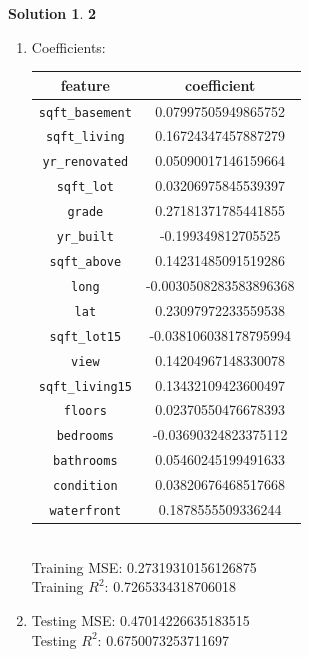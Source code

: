 \documentclass[11pt]{article}
\theoremstyle{definition}
\theoremstyle{nopunct}
\newtheorem*{s}{Solution}
\begin{document}
\begin{s}\textbf{2}
    \begin{enumerate} 
        \item Coefficients: \bigskip \\
            \begin{tabular}{c c}
                feature & coefficient \\
                \hline
                \texttt{sqft\_basement}  & 0.07997505949865752 \\
                \texttt{sqft\_living}    & 0.16724347457887279 \\
                \texttt{yr\_renovated}   & 0.05090017146159664 \\
                \texttt{sqft\_lot}       & 0.03206975845539397 \\
                \texttt{grade}          & 0.27181371785441855 \\
                \texttt{yr\_built}       & -0.199349812705525 \\
                \texttt{sqft\_above}     & 0.14231485091519286 \\
                \texttt{long}           & -0.0030508283583896368 \\
                \texttt{lat}            & 0.23097972233559538 \\
                \texttt{sqft\_lot15}     & -0.038106038178795994 \\
                \texttt{view}           & 0.14204967148330078 \\
                \texttt{sqft\_living15}  & 0.13432109423600497 \\
                \texttt{floors}         & 0.02370550476678393 \\
                \texttt{bedrooms}       & -0.03690324823375112 \\
                \texttt{bathrooms}      & 0.05460245199491633 \\
                \texttt{condition}      & 0.03820676468517668 \\
                \texttt{waterfront}     & 0.1878555509336244

            \end{tabular} \bigskip \\
            Training MSE: 0.27319310156126875 \\
            Training $R^2$: 0.7265334318706018

        \item Testing MSE: 0.47014226635183515 \\
                Testing $R^2$: 0.6750073253711697


\end{enumerate}
\end{s}
\end{document}
